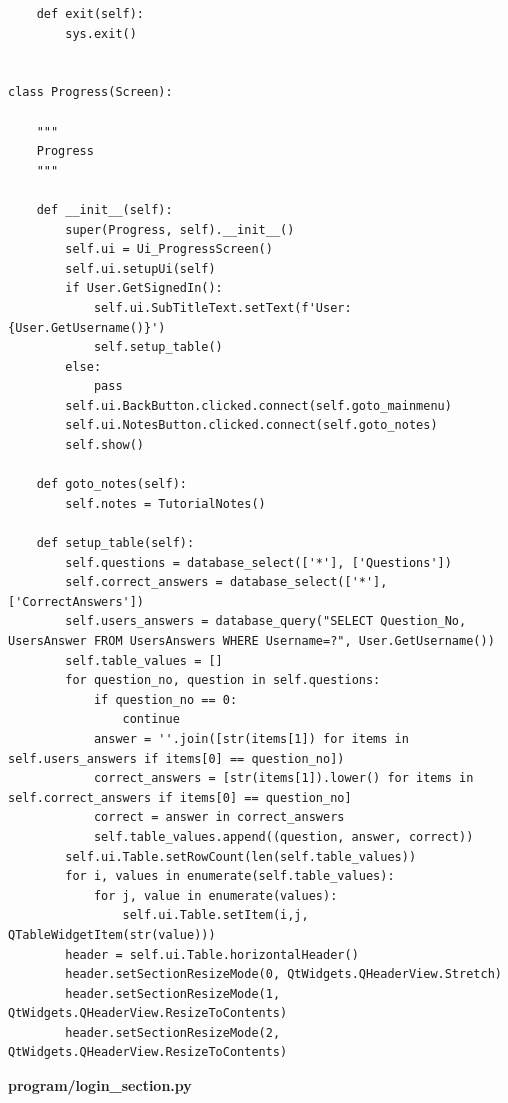 \documentclass{article}
\begin{document}
\begin{lstlisting}
    def exit(self):
        sys.exit()


class Progress(Screen):

    """
    Progress
    """

    def __init__(self):
        super(Progress, self).__init__()
        self.ui = Ui_ProgressScreen()
        self.ui.setupUi(self)
        if User.GetSignedIn():
            self.ui.SubTitleText.setText(f'User: {User.GetUsername()}')
            self.setup_table()
        else:
            pass
        self.ui.BackButton.clicked.connect(self.goto_mainmenu)
        self.ui.NotesButton.clicked.connect(self.goto_notes)
        self.show()

    def goto_notes(self):
        self.notes = TutorialNotes()

    def setup_table(self):
        self.questions = database_select(['*'], ['Questions'])
        self.correct_answers = database_select(['*'], ['CorrectAnswers'])
        self.users_answers = database_query("SELECT Question_No, UsersAnswer FROM UsersAnswers WHERE Username=?", User.GetUsername())
        self.table_values = []
        for question_no, question in self.questions:
            if question_no == 0:
                continue
            answer = ''.join([str(items[1]) for items in self.users_answers if items[0] == question_no])
            correct_answers = [str(items[1]).lower() for items in self.correct_answers if items[0] == question_no]
            correct = answer in correct_answers
            self.table_values.append((question, answer, correct))
        self.ui.Table.setRowCount(len(self.table_values))
        for i, values in enumerate(self.table_values):
            for j, value in enumerate(values):
                self.ui.Table.setItem(i,j, QTableWidgetItem(str(value)))
        header = self.ui.Table.horizontalHeader()
        header.setSectionResizeMode(0, QtWidgets.QHeaderView.Stretch)
        header.setSectionResizeMode(1, QtWidgets.QHeaderView.ResizeToContents)
        header.setSectionResizeMode(2, QtWidgets.QHeaderView.ResizeToContents)
\end{lstlisting}


\textbf{program/login\_section.py}
\end{document}
